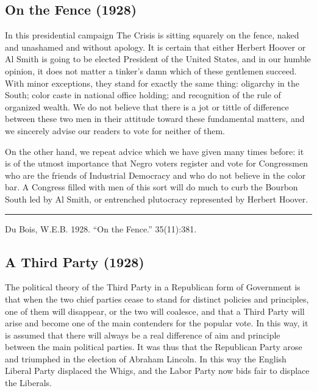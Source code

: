 \documentclass[letterpaper,10pt,english]{jupyterBook}
\begin{document}
\subsection{On the Fence (1928)}
\label{\detokenize{Volumes/35/11/on_the_fence:on-the-fence-1928}}\label{\detokenize{Volumes/35/11/on_the_fence::doc}}
\sphinxAtStartPar
In this presidential campaign The Crisis is sitting squarely on the fence, naked and unashamed and without apology. It is certain that either Herbert Hoover or Al Smith is going to be elected President of the United States, and in our humble opinion, it does not matter a tinker’s damn which of these gentlemen succeed. With minor exceptions, they stand for exactly the same thing: oligarchy in the South; color caste in national office holding; and recognition of the rule of organized wealth. We do not believe that there is a jot or tittle of difference between these two men in their attitude toward these fundamental matters, and we sincerely advise our readers to vote for neither of them.

\sphinxAtStartPar
On the other hand, we repeat advice which we have given many times before: it is of the utmost importance that Negro voters register and vote for Congressmen who are the friends of Industrial Democracy and who do not believe in the color bar. A Congress filled with men of this sort will do much to curb the Bourbon South led by Al Smith, or entrenched plutocracy represented by Herbert Hoover.


\bigskip\hrule\bigskip


\sphinxAtStartPar
{} Du Bois, W.E.B. 1928. “On the Fence.”   35(11):381.


\subsection{A Third Party (1928)}
\label{\detokenize{Volumes/35/11/third_party:a-third-party-1928}}\label{\detokenize{Volumes/35/11/third_party::doc}}
\sphinxAtStartPar
The political theory of the Third Party in a Republican form of Government is that when the two chief parties cease to stand for distinct policies and principles, one of them will disappear, or the two will coalesce, and that a Third Party will arise and become one of the main contenders for the popular vote. In this way, it is assumed that there will always be a real difference of aim and principle between the main political parties. It was thus that the Republican Party arose and triumphed in the election of Abraham Lincoln. In this way the English Liberal Party displaced the Whigs, and the Labor Party now bids fair to displace the Liberals.
\end{document}
